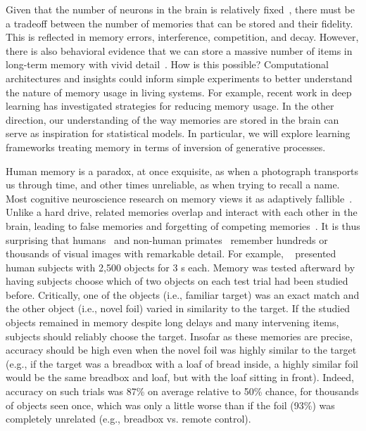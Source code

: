 \def\argmin{\mathop{arg\,min}}

\label{sec:aim4}

Given that the number of neurons in the brain is relatively fixed~\citep{Pakkenberg:1997,West:1994}, there must be a tradeoff between the number of
memories that can be stored and their fidelity.
This is reflected in memory errors, interference, competition,
and decay. However, there is also behavioral evidence that
we can store a massive number of items in long-term memory with
vivid detail~\citep[see][]{Brady:2011}. How is this possible?
Computational architectures and insights could inform simple
experiments to better understand the nature of memory usage in living
systems. For example, recent work in deep learning has investigated
strategies for reducing memory usage. In the other direction, our
understanding of the way memories are stored in the brain can serve as
inspiration for statistical models. In particular,
we will explore learning frameworks treating memory in terms of
inversion of generative processes.

\biobackground{}Human memory is a paradox, at once exquisite, as when
a photograph transports us through time,
and other times unreliable, as when trying to recall a name. 
Most cognitive neuroscience research on
memory views it as adaptively fallible~\citep{Schacter:2011}. Unlike a hard drive, related
memories overlap and interact with each other in the brain, leading to false memories and forgetting of competing memories~\citep{Kim:2014,Wimber:2015}. It is thus surprising that
humans~\citep{Standing:1973,Brady:2008} and non-human
primates~\citep{Woloszyn:2012,Meyer:2018} remember
hundreds or thousands of visual images with remarkable detail. For
example, ~\citet{Brady:2008} presented human subjects with 2,500
objects for 3 s each. Memory was tested afterward by having subjects
choose which of two objects on each test trial had been studied
before. Critically, one of the objects (i.e., familiar target) was an exact match
and the other object (i.e., novel foil) varied
in similarity to the target. If the studied objects remained in
memory despite long delays and many intervening items, subjects
should reliably choose the target. Insofar as these memories
are precise, accuracy should be high even when the novel
foil was highly similar to the target (e.g., if the target
was a breadbox with a loaf of bread inside, a highly similar foil 
would be the same breadbox and loaf, but with the loaf
sitting in front). Indeed, accuracy on such trials was 87\% on average
relative to 50\% chance, for thousands of objects seen once, which was
only a little worse than if the foil (93\%) was completely unrelated
(e.g., breadbox vs. remote control).

